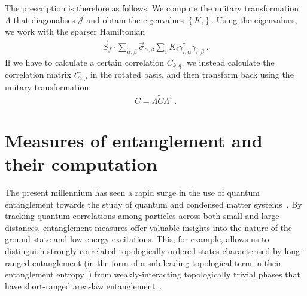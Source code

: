 The prescription is therefore as follows. We compute the unitary transformation \(\Lambda\) that diagonalises \(\mathcal{J}\) and obtain the eigenvalues \(\left\{K_i\right\}\). Using the eigenvalues, we work with the sparser Hamiltonian
\begin{equation}\begin{aligned}
	\vec{S}_f \cdot \sum_{\alpha,\beta}\vec{\sigma}_{\alpha,\beta}\sum_i K_i \gamma^\dagger_{i,\alpha}\gamma_{i,\beta}~.
\end{aligned}\end{equation}
If we have to calculate a certain correlation \(C_{k,q}\), we instead calculate the correlation matrix \(\tilde C_{i,j}\) in the rotated basis, and then transform back using the unitary transformation:
\begin{equation}\begin{aligned}
	C = \Lambda \tilde C \Lambda^\dagger~.
\end{aligned}\end{equation}

\section{Measures of entanglement and their computation}
The present millennium has seen a rapid surge in the use of quantum entanglement towards the study of quantum and condensed matter systems~\cite{terhal_physicstoday_2003,horodecki2009quantum,eisert_entanglement_2010,laflorencie2016quantum,zeng2019,Erhard2020}. By tracking quantum correlations among particles across both small and large distances, entanglement measures offer valuable insights into the nature of the ground state and low-energy excitations. This, for example, allows us to distinguish strongly-correlated topologically ordered states characterised by long-ranged entanglement (in the form of a sub-leading topological term in their entanglement entropy~\cite{wen_1990,Wen_fqhe_1990,wen1995topological,niu1985quantized}) from weakly-interacting topologically trivial phases that have short-ranged area-law entanglement~\cite{das_shankaranarayanan_2006,cramer_eisert_2006,eisert_entanglement_2010}.

